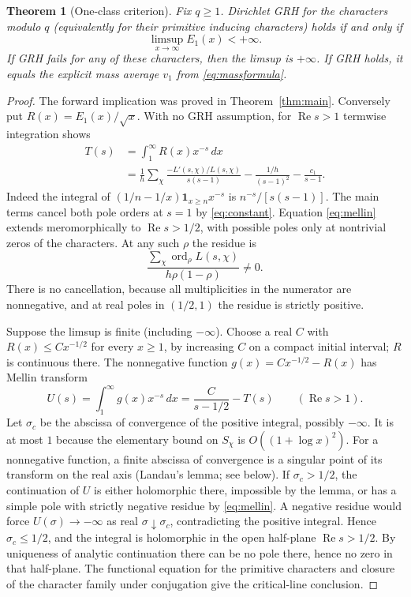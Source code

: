 \documentclass[11pt]{article}
\newtheorem{theorem}{Theorem}[section]
\theoremstyle{remark}\newtheorem{remark}[theorem]{Remark}
\newcommand{\Rea}{\operatorname{Re}}
\newcommand{\ord}{\operatorname{ord}}
\begin{document}
\begin{theorem}[One-class criterion]\label{thm:converse}
Fix $q\ge1$. Dirichlet GRH for the characters modulo $q$ (equivalently for their primitive inducing characters) holds if and only if
\[
 \limsup_{x\to\infty} E_1(x)<+\infty.
\]
If GRH fails for any of these characters, then the limsup is $+\infty$. If GRH holds, it equals the explicit mass average $v_1$ from \eqref{eq:massformula}.
\end{theorem}
\begin{proof}
The forward implication was proved in Theorem~\ref{thm:main}. Conversely put $R(x)=E_1(x)/\sqrt{x}$. With no GRH assumption, for $\Rea s>1$ termwise integration shows
\begin{align}
 T(s)&=\int_1^\infty R(x)x^{-s}\,dx\nonumber\\
 &=\frac1h\sum_\chi\frac{-L'(s,\chi)/L(s,\chi)}{s(s-1)}
 -\frac{1/h}{(s-1)^2}-\frac{c_1}{s-1}.\label{eq:mellin}
\end{align}
Indeed the integral of $(1/n-1/x)\mathbf1_{x\ge n}x^{-s}$ is $n^{-s}/[s(s-1)]$. The main terms cancel both pole orders at $s=1$ by \eqref{eq:constant}. Equation \eqref{eq:mellin} extends meromorphically to $\Rea s>1/2$, with possible poles only at nontrivial zeros of the characters. At any such $\rho$ the residue is
\[
 \frac{\sum_\chi \ord_\rho L(s,\chi)}{h\rho(1-\rho)}\ne0.
\]
There is no cancellation, because all multiplicities in the numerator are nonnegative, and at real poles in $(1/2,1)$ the residue is strictly positive.

Suppose the limsup is finite (including $-\infty$). Choose a real $C$ with $R(x)\le Cx^{-1/2}$ for every $x\ge1$, by increasing $C$ on a compact initial interval; $R$ is continuous there. The nonnegative function $g(x)=Cx^{-1/2}-R(x)$ has Mellin transform
\[
 U(s)=\int_1^\infty g(x)x^{-s}\,dx=\frac{C}{s-1/2}-T(s)\qquad(\Rea s>1).
\]
Let $\sigma_c$ be the abscissa of convergence of the positive integral, possibly $-\infty$. It is at most $1$ because the elementary bound on $S_\chi$ is $O((1+\log x)^2)$. For a nonnegative function, a finite abscissa of convergence is a singular point of its transform on the real axis (Landau's lemma; see below). If $\sigma_c>1/2$, the continuation of $U$ is either holomorphic there, impossible by the lemma, or has a simple pole with strictly negative residue by \eqref{eq:mellin}. A negative residue would force $U(\sigma)\to-\infty$ as real $\sigma\downarrow\sigma_c$, contradicting the positive integral. Hence $\sigma_c\le1/2$, and the integral is holomorphic in the open half-plane $\Rea s>1/2$. By uniqueness of analytic continuation there can be no pole there, hence no zero in that half-plane. The functional equation for the primitive characters and closure of the character family under conjugation give the critical-line conclusion.\end{proof}
\end{document}

